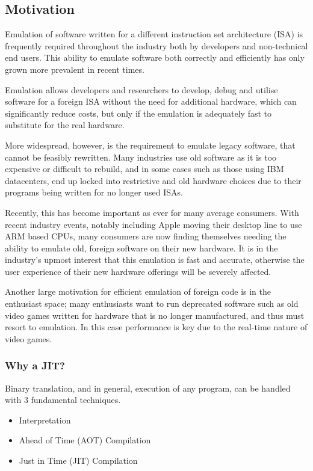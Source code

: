 \subsection{Motivation}

Emulation of software written for a different instruction set architecture (ISA) is frequently required throughout the industry both by developers and non-technical end users. This ability to emulate software both correctly and efficiently has only grown more prevalent in recent times.

Emulation allows developers and researchers to develop, debug and utilise software for a foreign ISA without the need for additional hardware, which can significantly reduce costs, but only if the emulation is adequately fast to substitute for the real hardware.

More widespread, however, is the requirement to emulate legacy software, that cannot be feasibly rewritten. Many industries use old software as it is too expensive or difficult to rebuild, and in some cases such as those using IBM datacenters, end up locked into restrictive and old hardware choices due to their programs being written for no longer used ISAs.

Recently, this has become important as ever for many average consumers. With recent industry events, notably including Apple moving their desktop line to use ARM based CPUs, many consumers are now finding themselves needing the ability to emulate old, foreign software on their new hardware. It is in the industry's upmost interest that this emulation is fast and accurate, otherwise the user experience of their new hardware offerings will be severely affected.

Another large motivation for efficient emulation of foreign code is in the enthusiast space; many enthusiasts want to run deprecated software such as old video games written for hardware that is no longer manufactured, and thus must resort to emulation. In this case performance is key due to the real-time nature of video games.

\subsubsection{Why a JIT?}

Binary translation, and in general, execution of any program, can be handled with 3 fundamental techniques.

\begin{itemize}
    \item Interpretation
    \item Ahead of Time (AOT) Compilation
    \item Just in Time (JIT) Compilation
\end{itemize}

